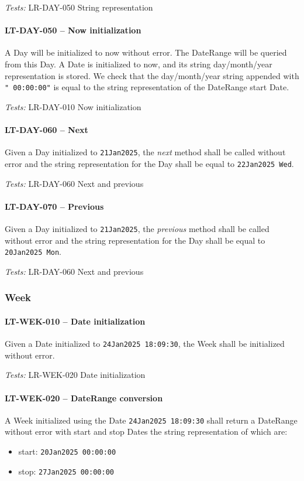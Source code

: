\textit{Tests: } LR-DAY-050 String representation

\paragraph{LT-DAY-050 -- Now initialization}
A Day will be initialized to now without error. The DateRange will be queried
from this Day.
A Date is initialized to now, and its string day/month/year representation
is stored.
We check that the day/month/year string appended with \lstinline{" 00:00:00"} is
equal to the string representation of the DateRange start Date.

\textit{Tests: } LR-DAY-010 Now initialization

\paragraph{LT-DAY-060 -- Next}
Given a Day initialized to \lstinline{21Jan2025}, the \emph{next} method
shall be called without error and the string representation for the Day
shall be equal to \lstinline{22Jan2025 Wed}.

\textit{Tests: } LR-DAY-060 Next and previous

\paragraph{LT-DAY-070 -- Previous}
Given a Day initialized to \lstinline{21Jan2025}, the \emph{previous} method
shall be called without error and the string representation for the Day
shall be equal to \lstinline{20Jan2025 Mon}.

\textit{Tests: } LR-DAY-060 Next and previous

\subsubsection{Week}
\paragraph{LT-WEK-010 -- Date initialization}
Given a Date initialized to \lstinline{24Jan2025 18:09:30}, the Week
shall be initialized without error.

\textit{Tests: } LR-WEK-020 Date initialization

\paragraph{LT-WEK-020 -- DateRange conversion}
A Week initialized using the Date \lstinline{24Jan2025 18:09:30} shall
return a DateRange without error with start and stop Dates the string
representation of which are:
\begin{itemize}
\item start: \lstinline{20Jan2025 00:00:00}
\item stop: \lstinline{27Jan2025 00:00:00}
\end{itemize}


